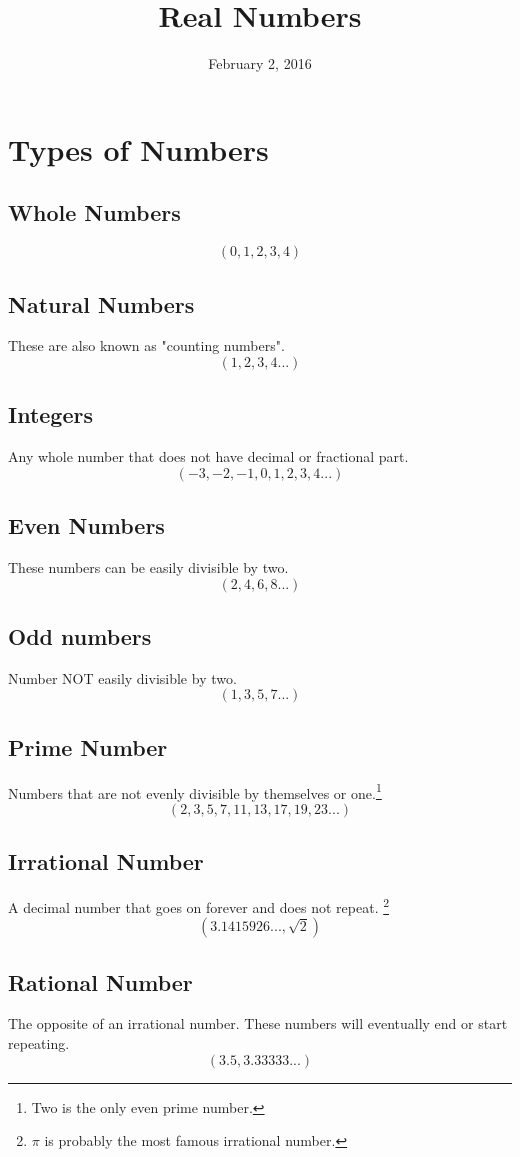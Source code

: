 \documentclass[]{article}
\title{Real Numbers}
\date{February 2, 2016}
\author{}
\begin{document}
\maketitle

\tableofcontents
\pagebreak

\section{Types of Numbers}
\subsection{Whole Numbers}
$$ (0,1,2,3,4)$$
\subsection{Natural Numbers}
These are also known as "counting numbers". $$(1,2,3,4...)$$
\subsection{Integers}
Any whole number that does not have decimal or fractional part.
$$(-3,-2,-1,0,1,2,3,4...)$$
\subsection{Even Numbers}
These numbers can be easily divisible by two.
$$(2,4,6,8...)$$
\subsection{Odd numbers}
Number NOT easily divisible by two.
$$(1,3,5,7...)$$
\subsection{Prime Number}
Numbers that are not evenly divisible by themselves or one.\footnote{Two is the only even prime number.}
$$(2,3,5,7,11,13,17,19,23...)$$
\subsection{Irrational Number}
A decimal number that goes on forever and does not repeat. \footnote{$\pi$ is probably the most famous irrational number.}
$$(3.1415926..., \sqrt 2)$$
\subsection{Rational Number}
The opposite of an irrational number. These numbers will eventually end or start repeating.
$$(3.5,3.33333...)$$
\end{document}
